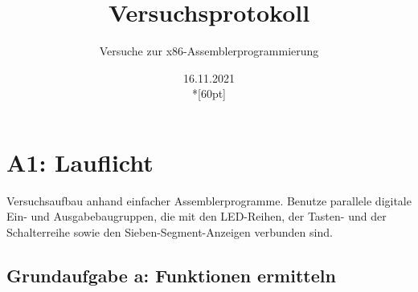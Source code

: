 \documentclass[a4paper,12pt,titlepage]{scrartcl}
\begin{document}
\titlehead
{
    \small
    {
        Technische Universität Ilmenau\\
        Fakulät IA\\
        Fachgebiet Rechnerarchitektur\\

        Praktikum Rechnerarchitektur 1\\
        WS 2021/22}
}

\title {Versuchsprotokoll}
\subtitle{Versuche zur x86-Assemblerprogrammierung}
\author{}
\date{16.11.2021\\*[60pt]}
\maketitle  %

\pagestyle{fancy}
\newpage

\section*{A1: Lauflicht}
Versuchsaufbau anhand einfacher Assemblerprogramme. Benutze parallele digitale Ein- und Ausgabebaugruppen, die mit den LED-Reihen, der Tasten- und der Schalterreihe sowie den Sieben-Segment-Anzeigen verbunden sind.
\subsection*{Grundaufgabe a: Funktionen ermitteln}
\end{document}
